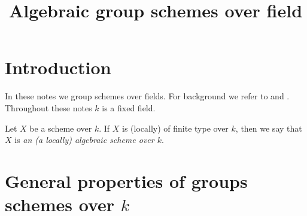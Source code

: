 



\title{Algebraic group schemes over field}
\date{}
\maketitle

\section{Introduction}
\noindent
In these notes we group schemes over fields. For background we refer to \cite{kfunctors} and \cite{Monoid_k_functors}.\\
Throughout these notes $k$ is a fixed field.

\begin{definition}
Let $X$ be a scheme over $k$. If $X$ is (locally) of finite type over $k$, then we say that $X$ is \textit{an (a locally) algebraic scheme over $k$}.
\end{definition}

\section{General properties of groups schemes over $k$}

